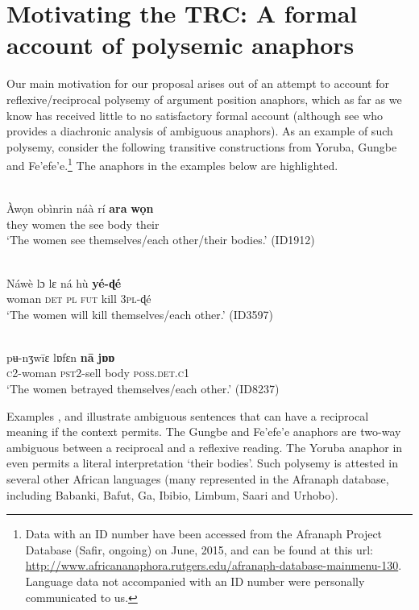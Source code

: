 \documentclass[output=paper]{langsci/langscibook}
\begin{document}
\section{Motivating the TRC: A formal account of polysemic anaphors}\label{sec:safir:2}



Our main motivation for our proposal arises out of an attempt to account for reflexive/reciprocal polysemy of argument position anaphors, which as far as we know has received little to no satisfactory formal account (although see \citealt{Heine1999} who provides a diachronic analysis of ambiguous anaphors). As an example of such polysemy, consider the following transitive constructions from Yoruba, Gungbe and Fe'efe'e.\footnote{Data with an ID number have been accessed from the Afranaph Project Database (Safir, ongoing) on June, 2015, and can be found at this url: \url{http://www.africananaphora.rutgers.edu/afranaph-database-mainmenu-130}. Language data not accompanied with an ID number were personally communicated to us.} The anaphors in the examples below are highlighted.




\ea\label{ex:safir:2}
 \\
\gll Àwọn     obìnrin   náà  rí   \textbf{ara}   \textbf{wọn} \\
they     women   the   see   body   their\\
\glt  ‘The women see themselves/each other/their bodies.’ {(ID1912)}
\z


\ea\label{ex:safir:3}
 \\
\gll Náwè     lɔ  lɛ  ná  hù  \textbf{yé-ɖé} \\
woman    \textsc{det}  \textsc{pl}  \textsc{fut}  kill  \textsc{3pl}-ɖé \\
\glt ‘The women will kill themselves/each other.’ (ID3597) 
\z


\ea\label{ex:safir:4}
 \\
\gll pʉ-nʒwīɛ   lɒfɛn     \textbf{nā}   \textbf{jɒɒ} \\
\textsc{c}{2-woman}   {\textsc{pst2}}-sell   body   \textsc{poss.det.c1}\\
\glt ‘The women betrayed themselves/each other.’ {(ID8237)} 
\z


Examples ,  and  illustrate ambiguous sentences that can have a reciprocal meaning if the context permits. The Gungbe and Fe'efe'e anaphors are two-way ambiguous between a reciprocal and a reflexive reading. The Yoruba anaphor in  even permits a literal interpretation ‘their bodies’. Such polysemy is attested in several other African languages (many represented in the Afranaph database, including Babanki, Bafut, Ga, Ibibio, Limbum, Saari and Urhobo).
\end{document}
